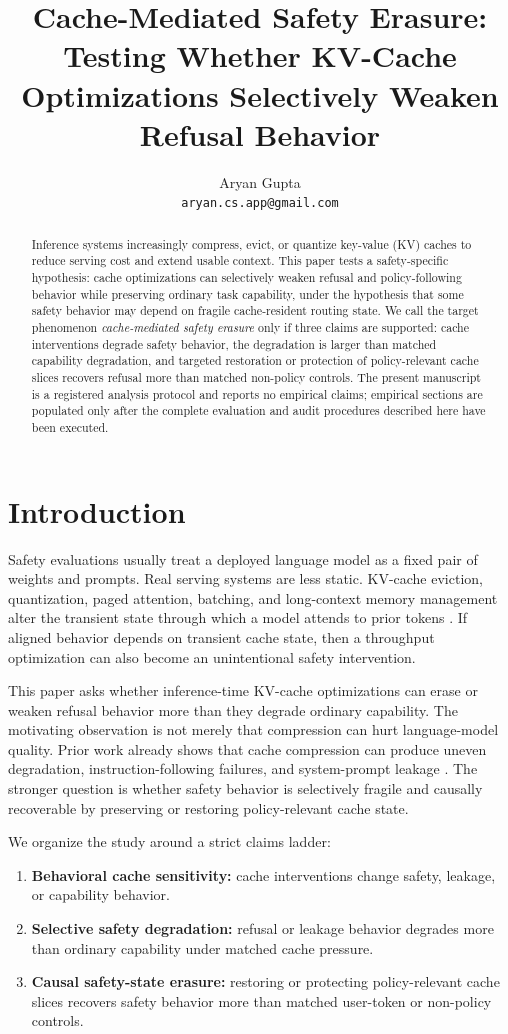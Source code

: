 \documentclass[11pt]{article}
\title{Cache-Mediated Safety Erasure:\\
Testing Whether KV-Cache Optimizations Selectively Weaken Refusal Behavior}
\author{
  Aryan Gupta\\
  \texttt{aryan.cs.app@gmail.com}
}
\date{}
\newcommand{\EmpiricalStatusSentence}{%
The present manuscript is a registered analysis protocol and reports no empirical claims; empirical sections are populated only after the complete evaluation and audit procedures described here have been executed.%
}
\begin{document}
\maketitle

\begin{abstract}
Inference systems increasingly compress, evict, or quantize key-value (KV) caches to reduce serving cost and extend usable context. This paper tests a safety-specific hypothesis: cache optimizations can selectively weaken refusal and policy-following behavior while preserving ordinary task capability, under the hypothesis that some safety behavior may depend on fragile cache-resident routing state. We call the target phenomenon \emph{cache-mediated safety erasure} only if three claims are supported: cache interventions degrade safety behavior, the degradation is larger than matched capability degradation, and targeted restoration or protection of policy-relevant cache slices recovers refusal more than matched non-policy controls. \EmpiricalStatusSentence
\end{abstract}

\section{Introduction}

Safety evaluations usually treat a deployed language model as a fixed pair of weights and prompts. Real serving systems are less static. KV-cache eviction, quantization, paged attention, batching, and long-context memory management alter the transient state through which a model attends to prior tokens \citep{kwon2023pagedattention}. If aligned behavior depends on transient cache state, then a throughput optimization can also become an unintentional safety intervention.

This paper asks whether inference-time KV-cache optimizations can erase or weaken refusal behavior more than they degrade ordinary capability. The motivating observation is not merely that compression can hurt language-model quality. Prior work already shows that cache compression can produce uneven degradation, instruction-following failures, and system-prompt leakage \citep{chen2025pitfalls,ananthanarayanan2026physics,yang2024notoken}. The stronger question is whether safety behavior is selectively fragile and causally recoverable by preserving or restoring policy-relevant cache state.

We organize the study around a strict claims ladder:
\begin{enumerate}
  \item \textbf{Behavioral cache sensitivity:} cache interventions change safety, leakage, or capability behavior.
  \item \textbf{Selective safety degradation:} refusal or leakage behavior degrades more than ordinary capability under matched cache pressure.
  \item \textbf{Causal safety-state erasure:} restoring or protecting policy-relevant cache slices recovers safety behavior more than matched user-token or non-policy controls.
\end{enumerate}
\end{document}

